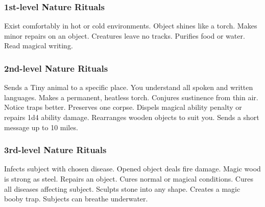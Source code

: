 \subsubsection{1st-level Nature Rituals}
\begin{rituallist}
     Exist comfortably in hot or cold environments.
     Object shines like a torch.
     Makes minor repairs on an object.
     Creatures leave no tracks.
     Purifies food or water.
     Read magical writing.
\end{rituallist}

\subsubsection{2nd-level Nature Rituals}
\begin{rituallist}
     Sends a Tiny animal to a specific place.
     You understand all spoken and written languages.
     Makes a permanent, heatless torch.
     Conjures sustinence from thin air.
     Notice traps better.
     Preserves one corpse.
     Dispels magical ability penalty or repairs 1d4 ability damage.
     Rearranges wooden objects to suit you.
     Sends a short message up to 10 miles.
\end{rituallist}

\subsubsection{3rd-level Nature Rituals}
\begin{rituallist}
     Infects subject with chosen disease.
     Opened object deals fire damage.
     Magic wood is strong as steel.
     Repairs an object.
     Cures normal or magical conditions.
     Cures all diseases affecting subject.
     Sculpts stone into any shape.
     Creates a magic booby trap.
     Subjects can breathe underwater.
\end{rituallist}

